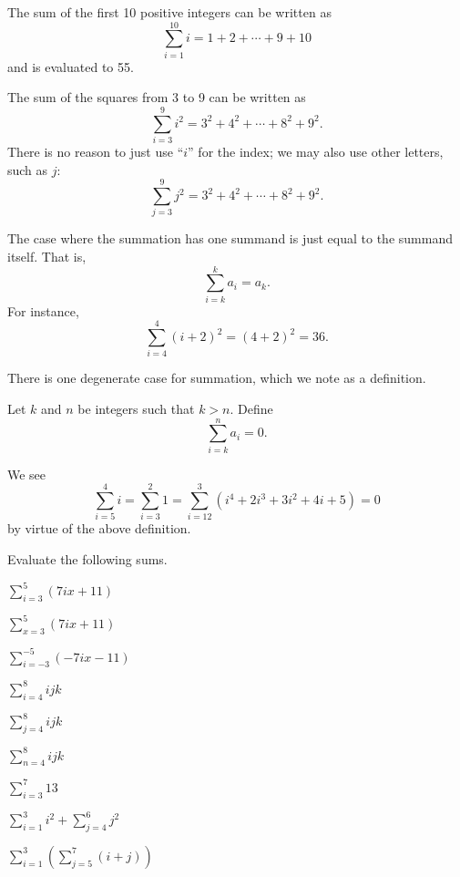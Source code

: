 \begin{example}
    The sum of the first 10 positive integers can be written as
    \[
        \sum_{i=1}^{10}i = 1 + 2 + \cdots + 9 + 10
    \]
    and is evaluated to 55.
\end{example}

\begin{example}
    The sum of the squares from 3 to 9 can be written as
    \[
        \sum_{i=3}^{9}i^2 = 3^2 + 4^2 + \cdots + 8^2 + 9^2.
    \]
    There is no reason to just use ``$i$'' for the index; we may also use other letters, such as $j$:
    \[
        \sum_{j=3}^{9}j^2 = 3^2 + 4^2 + \cdots + 8^2 + 9^2.
    \]
\end{example}

\begin{example}
    The case where the summation has one summand is just equal to the summand itself. That is,
    \[
        \sum_{i=k}^{k}a_i = a_k.
    \]
    For instance,
    \[
        \sum_{i=4}^4(i+2)^2 = (4+2)^2 = 36.
    \]
\end{example}

There is one degenerate case for summation, which we note as a definition.
\begin{definition}
    Let $k$ and $n$ be integers such that $k > n$. Define
    \[
        \sum_{i=k}^{n}a_i = 0.
    \]
\end{definition}
\begin{example}
    We see
    \[
        \sum_{i=5}^{4}i = \sum_{i=3}^{2}1 = \sum_{i=12}^{3}(i^4 + 2i^3 + 3i^2 + 4i + 5) = 0
    \]
    by virtue of the above definition.
\end{example}
\begin{exercise}
    Evaluate the following sums.
    \begin{multicols}{3}
        \begin{partquestions}{\alph*}
            \item $\displaystyle \sum_{i=3}^{5}(7ix+11)$
            \item $\displaystyle \sum_{x=3}^{5}(7ix+11)$
            \item $\displaystyle \sum_{i=-3}^{-5}(-7ix-11)$
            \item $\displaystyle \sum_{i=4}^{8}ijk$
            \item $\displaystyle \sum_{j=4}^{8}ijk$
            \item $\displaystyle \sum_{n=4}^{8}ijk$
            \item $\displaystyle \sum_{i=3}^{7}13$
            \item $\displaystyle \sum_{i=1}^{3}i^2 + \sum_{j=4}^{6}j^2$
            \item $\displaystyle \sum_{i=1}^{3}\left(\sum_{j=5}^{7}(i+j)\right)$
        \end{partquestions}
    \end{multicols}
\end{exercise}

